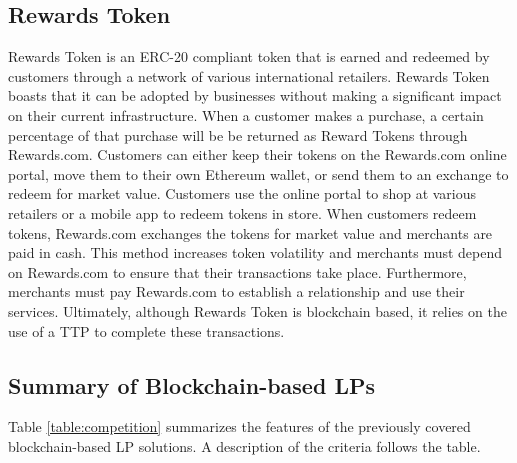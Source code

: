 \subsection{Rewards Token}
Rewards Token \cite{RWRD17} is an ERC-20 compliant token that is earned and redeemed by customers through a network of various international retailers. Rewards Token boasts that it can be adopted by businesses without making a significant impact on their current infrastructure. When a customer makes a purchase, a certain percentage of that purchase will be be returned as Reward Tokens through Rewards.com. Customers can either keep their tokens on the Rewards.com online portal, move them to their own Ethereum wallet, or send them to an exchange to redeem for market value. Customers use the online portal to shop at various retailers or a mobile app to redeem tokens in store. When customers redeem tokens, Rewards.com exchanges the tokens for market value and merchants are paid in cash. This method increases token volatility and merchants must depend on Rewards.com to ensure that their transactions take place. Furthermore, merchants must pay Rewards.com to establish a relationship and use their services. Ultimately, although Rewards Token is blockchain based, it relies on the use of a TTP to complete these transactions.

\subsection{Summary of Blockchain-based LPs}
Table \ref{table:competition} summarizes the features of the previously covered blockchain-based LP solutions. A description of the criteria follows the table.
%
\begin{table}[h]
\centering
\caption{Characteristics of Various Blockchain-Based LPs} \label{table:competition}
\end{table}

